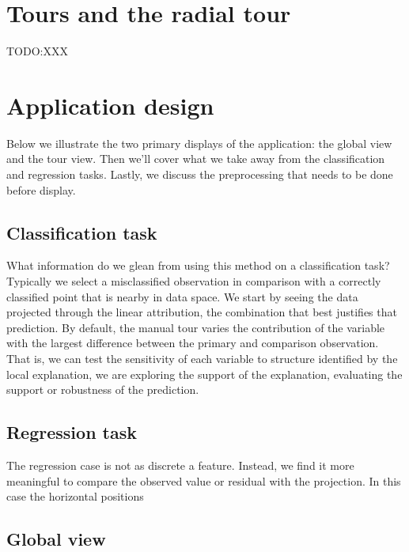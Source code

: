 \documentclass[
]{article}
\begin{document}
\hypertarget{tours-and-the-radial-tour}{%
\section{Tours and the radial tour}\label{tours-and-the-radial-tour}}

TODO:XXX

\hypertarget{sec:applicationdesign}{%
\section{Application design}\label{sec:applicationdesign}}

Below we illustrate the two primary displays of the application: the global view and the tour view. Then we'll cover what we take away from the classification and regression tasks. Lastly, we discuss the preprocessing that needs to be done before display.

\hypertarget{classification-task}{%
\subsection{Classification task}\label{classification-task}}

What information do we glean from using this method on a classification task? Typically we select a misclassified observation in comparison with a correctly classified point that is nearby in data space. We start by seeing the data projected through the linear attribution, the combination that best justifies that prediction. By default, the manual tour varies the contribution of the variable with the largest difference between the primary and comparison observation. That is, we can test the sensitivity of each variable to structure identified by the local explanation, we are exploring the support of the explanation, evaluating the support or robustness of the prediction.

\hypertarget{regression-task}{%
\subsection{Regression task}\label{regression-task}}

The regression case is not as discrete a feature. Instead, we find it more meaningful to compare the observed value or residual with the projection. In this case the horizontal positions

\hypertarget{global-view}{%
\subsection{Global view}\label{global-view}}
\end{document}

